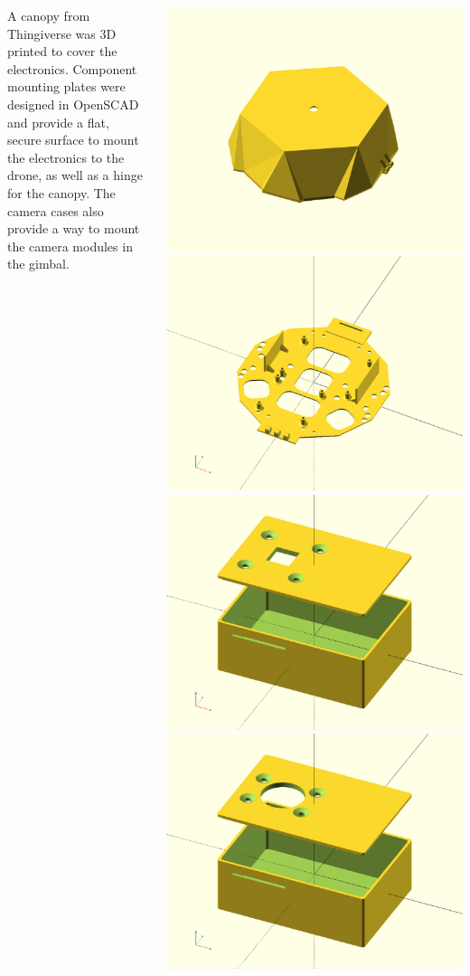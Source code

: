 \documentclass[a1paper, landscape, blockverticalspace=1cm, 14pt]{tikzposter}
\begin{document}
\begin{columns}
    {
        \normalsize
        A canopy from Thingiverse was 3D printed to cover the electronics.
        Component mounting plates were designed in OpenSCAD and provide a flat, secure surface to mount the electronics to the drone, as well as a hinge for the canopy.
        The camera cases also provide a way to mount the camera modules in the gimbal.

        \begin{tikzfigure}
            \includegraphics[width=0.4\linewidth]{canopy.png}
            \includegraphics[width=0.4\linewidth]{component_mounting_plate}
            \includegraphics[width=0.4\linewidth]{coral_case.png}
            \includegraphics[width=0.4\linewidth]{nano_case.png}
        \end{tikzfigure}
    }


\end{columns}
\end{document}

